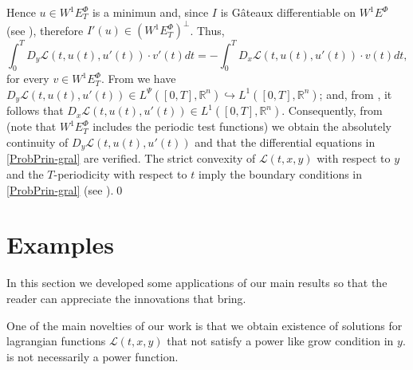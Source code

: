 \documentclass[twoside]{article}
\theoremstyle{remark}
\newcommand{\lpsi}{L^{\Psi}}
\newcommand{\ephi}{E^{\Phi}}
\newcommand{\wphiet}{W^{1}\ephi_T}
\newcommand{\wphie}{W^{1}\ephi}
\newcommand{\rr}{\mathbb{R}}
\newcounter{example}
\begin{document}
Hence $u\in \wphiet$ is a minimun and, since $I$ is G\^ateaux differentiable on $\wphie$ (see  \cite[Thm. 3.2]{ABGMS2015}), 
therefore $I'(u)\in (\wphiet)^{\perp}$. Thus,
\[\int_0^T D_y\mathcal{L}(t,u(t),u'(t))\cdot v'(t)dt =-\int_0^T D_x\mathcal{L}(t,u(t),u'(t))\cdot v(t)dt,\]
for every  $v\in \wphiet$.  
From \cite[Eq. (26)]{ABGMS2015} we have
 $D_y\mathcal{L}(t,u(t),u'(t))\in \lpsi([0,T],\rr^n)\hookrightarrow L^1([0,T],\rr^n)$;
and,  from  \cite[Eq. (24)]{ABGMS2015}, it follows that $D_x\mathcal{L}(t,u(t),u'(t))\in L^1([0,T],\rr^n)$. 
Consequently, from \cite[p. 6]{mawhin2010critical} 
(note that $\wphiet$  includes the periodic test functions) we obtain the absolutely continuity of $D_y\mathcal{L}(t,u(t),u'(t))$ and that the differential equations in \eqref{ProbPrin-gral} are verified. The strict convexity of $\mathcal{L}(t,x,y)$ with respect to $y$ and the $T$-periodicity with respect to $t$ imply the boundary conditions in  \eqref{ProbPrin-gral} (see \cite[Thm. 4.1]{ABGMS2015}).\qed




 \section{Examples}\label{sec:examples}

 In this section we developed some applications of our main results
so that the reader can appreciate the innovations that bring.


One of the main novelties of our work is that we obtain existence of solutions for lagrangian functions $\mathcal{L}(t,x,y)$ that not satisfy a power like grow condition in $y$.   is not necessarily  a power function.
\end{document}
